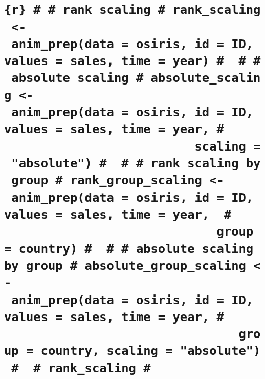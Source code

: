 \hypertarget{r-rank-scaling-rank_scaling---anim_prepdata-osiris-id-id-values-sales-time-year-absolute-scaling-absolute_scaling---anim_prepdata-osiris-id-id-values-sales-time-year-scaling-absolute-rank-scaling-by-group-rank_group_scaling---anim_prepdata-osiris-id-id-values-sales-time-year-group-country-absolute-scaling-by-group-absolute_group_scaling---anim_prepdata-osiris-id-id-values-sales-time-year-group-country-scaling-absolute-rank_scaling}{%
\section{\texorpdfstring{\texttt{\{r\}\ \#\ \#\ rank\ scaling\ \#\ rank\_scaling\ \textless{}-\ anim\_prep(data\ =\ osiris,\ id\ =\ ID,\ values\ =\ sales,\ time\ =\ year)\ \#\ \ \#\ \#\ absolute\ scaling\ \#\ absolute\_scaling\ \textless{}-\ anim\_prep(data\ =\ osiris,\ id\ =\ ID,\ values\ =\ sales,\ time\ =\ year,\ \#\ \ \ \ \ \ \ \ \ \ \ \ \ \ \ \ \ \ \ \ \ \ \ \ \ \ \ \ \ \ \ scaling\ =\ "absolute")\ \#\ \ \#\ \#\ rank\ scaling\ by\ group\ \#\ rank\_group\_scaling\ \textless{}-\ anim\_prep(data\ =\ osiris,\ id\ =\ ID,\ values\ =\ sales,\ time\ =\ year,\ \ \#\ \ \ \ \ \ \ \ \ \ \ \ \ \ \ \ \ \ \ \ \ \ \ \ \ \ \ \ \ \ \ \ \ group\ =\ country)\ \#\ \ \#\ \#\ absolute\ scaling\ by\ group\ \#\ absolute\_group\_scaling\ \textless{}-\ anim\_prep(data\ =\ osiris,\ id\ =\ ID,\ values\ =\ sales,\ time\ =\ year,\ \#\ \ \ \ \ \ \ \ \ \ \ \ \ \ \ \ \ \ \ \ \ \ \ \ \ \ \ \ \ \ \ \ \ \ \ \ \ group\ =\ country,\ scaling\ =\ "absolute")\ \#\ \ \#\ rank\_scaling\ \#}}{\{r\} \# \# rank scaling \# rank\_scaling \textless- anim\_prep(data = osiris, id = ID, values = sales, time = year) \#  \# \# absolute scaling \# absolute\_scaling \textless- anim\_prep(data = osiris, id = ID, values = sales, time = year, \#                               scaling = "absolute") \#  \# \# rank scaling by group \# rank\_group\_scaling \textless- anim\_prep(data = osiris, id = ID, values = sales, time = year,  \#                                 group = country) \#  \# \# absolute scaling by group \# absolute\_group\_scaling \textless- anim\_prep(data = osiris, id = ID, values = sales, time = year, \#                                     group = country, scaling = "absolute") \#  \# rank\_scaling \#}}\label{r-rank-scaling-rank_scaling---anim_prepdata-osiris-id-id-values-sales-time-year-absolute-scaling-absolute_scaling---anim_prepdata-osiris-id-id-values-sales-time-year-scaling-absolute-rank-scaling-by-group-rank_group_scaling---anim_prepdata-osiris-id-id-values-sales-time-year-group-country-absolute-scaling-by-group-absolute_group_scaling---anim_prepdata-osiris-id-id-values-sales-time-year-group-country-scaling-absolute-rank_scaling}}

